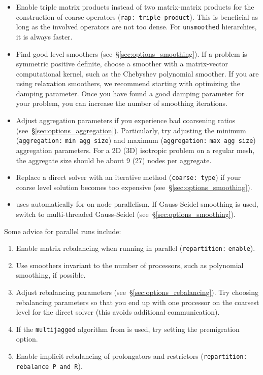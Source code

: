 \begin{itemize}
  \item
    Enable triple matrix products instead of two matrix-matrix products for
    the construction of coarse operators (\texttt{rap: triple product}).
    This is beneficial as long as the involved operators are not too dense.
    For \texttt{unsmoothed} hierarchies, it is always faster.

  \item
    Find good level smoothers (see~\S\ref{sec:options_smoothing}). If a problem
    is symmetric positive definite, choose a smoother with a matrix-vector
    computational kernel, such as the Chebyshev polynomial smoother. If you are
    using relaxation smoothers, we recommend starting with optimizing the
    damping parameter. Once you have found a good damping parameter for your
    problem, you can increase the number of smoothing iterations.

  \item
    Adjust aggregation parameters if you experience bad coarsening ratios
    (see~\S\ref{sec:options_aggregation}). Particularly, try adjusting the
    minimum (\texttt{aggregation:} \texttt{min agg size}) and maximum
    (\texttt{aggregation:} \texttt{max agg size}) aggregation parameters. For a
    2D (3D) isotropic problem on a regular mesh, the aggregate size should be
    about 9 (27) nodes per aggregate.

  \item
    Replace a direct solver with an iterative method (\texttt{coarse: type}) if
    your coarse level solution becomes too expensive (see~\S\ref{sec:options_smoothing}).

  \item
    \muelu{} uses \kokkos{} automatically for on-node parallelism.
    If Gauss-Seidel smoothing is used, switch to multi-threaded Gauss-Seidel (see~\S\ref{sec:options_smoothing}).

\end{itemize}

Some advice for parallel runs include:
\begin{enumerate}
  \item
    Enable matrix rebalancing when running in parallel (\texttt{repartition:}
    \texttt{enable}).

  \item
    Use smoothers invariant to the number of processors, such as
    polynomial smoothing, if possible.

  \item
    Adjust rebalancing parameters (see~\S\ref{sec:options_rebalancing}). Try
    choosing rebalancing parameters so that you end up with one processor on the
    coarsest level for the direct solver (this avoids additional communication).

  \item
    If the \texttt{multijagged} algorithm from  is used, try setting the premigration option.

  \item
    Enable implicit rebalancing of prolongators and restrictors
    (\texttt{repartition: rebalance P and R}).
\end{enumerate}

